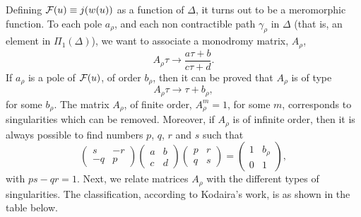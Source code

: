 Defining ${\cal F}(u) \equiv j(w(u))$ as a function of $\Delta$,
it turns out to be a meromorphic function. To each pole
$a_{\rho}$, and each non contractible path $\gamma_{\rho}$ 
in $\Delta$ (that is, an element in $\Pi_1(\Delta)$), we want to
associate a monodromy matrix, $A_{\rho}$,
\begin{equation}
A_{\rho} \tau \rightarrow \frac {a\tau+b}{c\tau+d}.
\label{eq:II65}
\end{equation}
If $a_{\rho}$ is a pole of ${\cal F}(u)$, of order $b_{\rho}$,
then it can be proved that $A_{\rho}$ is of type
\begin{equation}
A_{\rho} \tau \rightarrow \tau + b_{\rho},
\label{eq:II66}
\end{equation}
for some $b_{\rho}$. The matrix $A_{\rho}$, of finite order, 
$A_{\rho}^m=1$, for some $m$, corresponds to singularities which can be removed. 
Moreover, if $A_{\rho}$ is of infinite order, then it is always possible 
to find numbers $p$, $q$, $r$ and $s$ such that
\begin{equation}
\left( \begin{array}{cc} s & -r  \\
			 -q & p 
	\end{array} \right)  
\left( \begin{array}{cc} a & b  \\
			 c & d 
	\end{array} \right)
\left( \begin{array}{cc} p & r  \\
			 q & s 
	\end{array} \right) = 
\left( \begin{array}{cc} 1 & b_{\rho}  \\
			 0 & 1 
	\end{array} \right),
\label{eq:II67}
\end{equation}
with $ps-qr=1$. Next, we relate matrices $A_{\rho}$ with the
different types of singularities. The classification, according
to Kodaira's work, is as shown in the table below.

